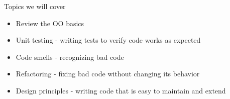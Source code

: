 \begin{frame}{Topics we will cover}

    \begin{itemize}
        \item Review the OO basics
        \item Unit testing - writing tests to verify code works as expected
        \item Code smells - recognizing bad code
        \item Refactoring - fixing bad code without changing its behavior
        \item Design principles - writing code that is easy to maintain and extend
    \end{itemize}
\end{frame}
